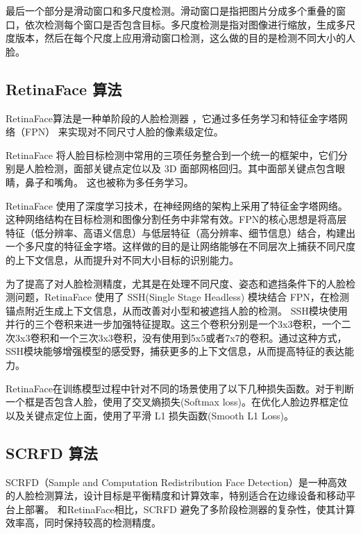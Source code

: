 \documentclass[a4paper]{article}
\begin{document}
最后一个部分是滑动窗口和多尺度检测。滑动窗口是指把图片分成多个重叠的窗口，依次检测每个窗口是否包含目标。多尺度检测是指对图像进行缩放，生成多尺度版本，然后在每个尺度上应用滑动窗口检测，这么做的目的是检测不同大小的人脸。

\subsection{RetinaFace 算法}

RetinaFace算法是一种单阶段的人脸检测器\cite{deng2019retinaface} \cite{deng2020retinaface}，它通过多任务学习和特征金字塔网络（FPN）\cite{lin2017feature} \cite{kim2018parallel} \cite{kirillov2019panoptic}来实现对不同尺寸人脸的像素级定位。

RetinaFace 将人脸目标检测中常用的三项任务整合到一个统一的框架中，它们分别是人脸检测，面部关键点定位以及 3D 面部网格回归。其中面部关键点包含眼睛，鼻子和嘴角。
这也被称为多任务学习。

RetinaFace 使用了深度学习技术，在神经网络的架构上采用了特征金字塔网络。这种网络结构在目标检测和图像分割任务中非常有效。FPN的核心思想是将高层特征（低分辨率、高语义信息）与低层特征（高分辨率、细节信息）结合，构建出一个多尺度的特征金字塔。这样做的目的是让网络能够在不同层次上捕获不同尺度的上下文信息，从而提升对不同大小目标的识别能力。

为了提高了对人脸检测精度，尤其是在处理不同尺度、姿态和遮挡条件下的人脸检测问题，RetinaFace 使用了 SSH(Single Stage Headless) 模块\cite{najibi2017ssh}结合 FPN，在检测锚点附近生成上下文信息，从而改善对小型和被遮挡人脸的检测。
SSH模块使用并行的三个卷积来进一步加强特征提取。这三个卷积分别是一个3x3卷积，一个二次3x3卷积和一个三次3x3卷积，没有使用到5x5或者7x7的卷积。通过这种方式，SSH模块能够增强模型的感受野，捕获更多的上下文信息，从而提高特征的表达能力。

RetinaFace在训练模型过程中针对不同的场景使用了以下几种损失函数。对于判断一个框是否包含人脸，使用了交叉熵损失(Softmax loss)。在优化人脸边界框定位以及关键点定位上面，使用了平滑 L1 损失函数(Smooth L1 Loss)。

\subsection{SCRFD 算法}

SCRFD（Sample and Computation Redistribution Face Detection）是一种高效的人脸检测算法\cite{guo2021sample}，设计目标是平衡精度和计算效率，特别适合在边缘设备和移动平台上部署。
和RetinaFace相比，SCRFD 避免了多阶段检测器的复杂性，使其计算效率高，同时保持较高的检测精度。
\end{document}
